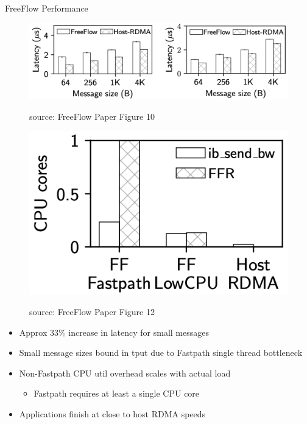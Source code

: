 \documentclass{beamer}
\begin{document}
\begin{frame}{FreeFlow Performance}
\begin{figure}
\begin{minipage}{.45\textwidth}
        \end{minipage}%
        \hspace{10pt}%
        \begin{minipage}{.45\textwidth}
        \includegraphics[width=\textwidth]{perfgraph2.png}
        \vspace{-25pt}
        \begin{center}
            \fontsize{4pt}{4pt}\selectfont source: FreeFlow Paper Figure 10
        \end{center}
        \end{minipage}
        \begin{minipage}{.25\textwidth}
        \includegraphics[width=\textwidth]{perfgraph3.png}
        \vspace{-25pt}
        \begin{center}
            \fontsize{4pt}{4pt}\selectfont source: FreeFlow Paper Figure 12
        \end{center}
        \end{minipage}
    \end{figure}

    \begin{itemize}
        \item Approx 33\% increase in latency for small messages
        \item Small message sizes bound in tput due to Fastpath single thread bottleneck
        \item Non-Fastpath CPU util overhead scales with actual load
            \begin{itemize}
                \item Fastpath requires at least a single CPU core
            \end{itemize}
        \item Applications finish at close to host RDMA speeds
    \end{itemize}
\end{frame}
\end{document}
